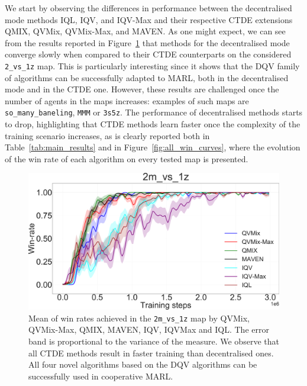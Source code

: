 We start by observing the differences in performance between the decentralised mode methods IQL, IQV, and IQV-Max and their respective CTDE extensions QMIX, QVMix, QVMix-Max, and MAVEN.
As one might expect, we can see from the results reported in Figure~\ref{fig:ch4_2m1zwin} that methods for the decentralised mode converge slowly when compared to their CTDE counterparts on the considered \texttt{2\_vs\_1z} map.
This is particularly interesting since it shows that the DQV family of algorithms can be successfully adapted to MARL, both in the decentralised mode and in the CTDE one.
However, these results are challenged once the number of agents in the maps increases: examples of such maps are \texttt{so\_many\_baneling}, \texttt{MMM} or \texttt{3s5z}.
The performance of decentralised methods starts to drop, highlighting that CTDE methods learn faster once the complexity of the training scenario increases, as is clearly reported both in Table~\ref{tab:main_results} and in Figure~\ref{fig:all_win_curves}, where the evolution of the win rate of each algorithm on every tested map is presented.

\begin{figure}
\centering
\includegraphics[width=.8\linewidth]{tex_thesis/figures/ch4/2m1zall.pdf}
\caption{Mean of win rates achieved in the \texttt{2m\_vs\_1z} map by QVMix, QVMix-Max, QMIX, MAVEN, IQV, IQVMax and IQL. The error band is proportional to the variance of the measure. We observe that all CTDE methods result in faster training than decentralised ones. All four novel algorithms based on the DQV algorithms can be successfully used in cooperative MARL.}
\label{fig:ch4_2m1zwin}
\end{figure}

